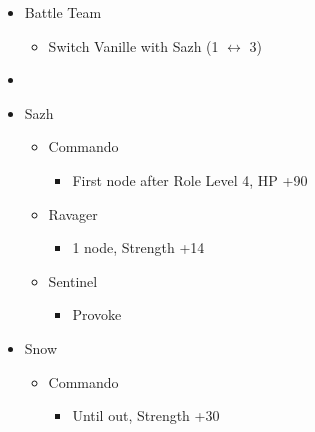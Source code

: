 \begin{menu}
\begin{itemize}
    \paradigm
    \begin{itemize}
        \item Battle Team
        \begin{itemize}
            \item Switch Vanille with Sazh (1 $\leftrightarrow$ 3)
        \end{itemize}
        \item {}%
{\paradigmline{\com}{\com}{\med}}%
{\paradigmline{\com}{\com}{(\com)}}%
{\paradigmline{(\rav)}{(\rav)}{(\med)}}%
{\paradigmline{\textit{\com}}{\textit{\rav}}{\textit(\sab)}}%
{\paradigmline{\rav}{\rav}{\sab}}%
{\paradigmline{\rav}{\rav}{\rav}}
    \end{itemize}
    \crystarium
    \begin{itemize}
        \item Sazh
        \begin{itemize}
            \item Commando
            \begin{itemize}
                \item First node after Role Level 4, HP +90
            \end{itemize}
            \item Ravager
            \begin{itemize}
                \item 1 node, Strength +14
            \end{itemize}
            \item Sentinel
            \begin{itemize}
                \item Provoke
            \end{itemize}
        \end{itemize}
        \item Snow
        \begin{itemize}
            \item Commando
            \begin{itemize}
                \item Until out, Strength +30
            \end{itemize}
        \end{itemize}
    \end{itemize}
    \equip
    \begin{itemize}

\end{itemize}
\end{itemize}
\end{menu}
